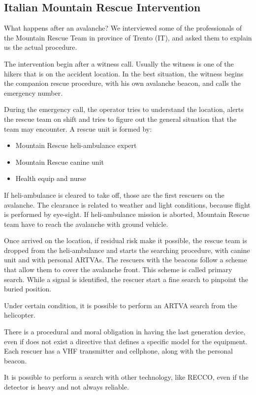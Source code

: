 \subsection{Italian Mountain Rescue Intervention}
What happens after an avalanche? We interviewed some of the professionals of the Mountain Rescue Team in province of Trento (IT), and asked them to explain us the actual procedure.

The intervention begin after a witness call. Usually the witness is one of the hikers that is on the accident location. In the best situation, the witness begins the companion rescue procedure, with his own avalanche beacon, and calls the emergency number.

During the emergency call, the operator tries to understand the location, alerts the rescue team on shift and tries to figure out the general situation that the team may encounter. A rescue unit is formed by:
\begin{itemize}
\item Mountain Rescue heli-ambulance expert
\item Mountain Rescue canine unit
\item Health equip and nurse
\end{itemize}
If heli-ambulance is cleared to take off, those are the first rescuers on the avalanche. The clearance is related to weather and light conditions, because flight is performed by eye-sight. If heli-ambulance mission is aborted, Mountain Rescue team have to reach the avalanche with ground vehicle.

Once arrived on the location, if residual risk make it possible, the rescue team is dropped from the heli-ambulance and starts the searching procedure, with canine unit and with personal ARTVAs. The rescuers with the beacons follow a scheme that allow them to cover the avalanche front. This scheme is called primary search. While a signal is identified, the rescuer start a fine search to pinpoint the buried position.

Under certain condition, it is possible to perform an ARTVA search from the helicopter.

There is a procedural and moral obligation in having the last generation device, even if does not exist a directive that defines a specific model for the equipment. Each rescuer has a VHF transmitter and cellphone, along with the personal beacon. 

It is possible to perform a search with other technology, like RECCO, even if the detector is heavy and not always reliable.


